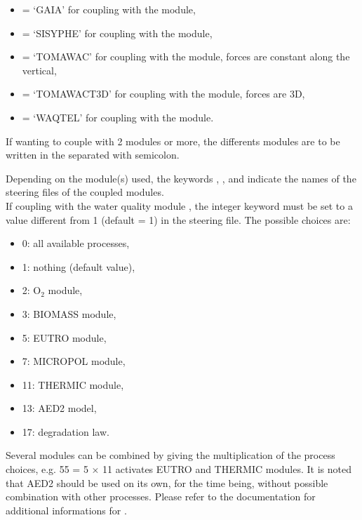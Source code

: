 \begin{itemize}
\item {} = `GAIA' for coupling with the \gaia module,

\item {} = `SISYPHE' for coupling with the \sisyphe module,

\item {} = `TOMAWAC' for coupling with the \tomawac module,
forces are constant along the vertical,

\item {} = `TOMAWACT3D' for coupling with the \tomawac module,
forces are 3D,

\item {} = `WAQTEL' for coupling with the \waqtel module.

\end{itemize}

If wanting to couple with 2 modules or more, the differents modules are to
be written in the  separated with semicolon.

Depending on the module(s) used, the keywords
, ,
 and 
indicate the names of the steering files
of the coupled modules.\\

If coupling with the water quality module \waqtel, the integer keyword
 must be set to a value different from 1
(default = 1) in the  steering file.
The possible choices are:
\begin{itemize}
\item 0: all available processes,
\item 1: nothing (default value),
\item 2: O$_2$ module,
\item 3: BIOMASS module,
\item 5: EUTRO module,
\item 7: MICROPOL module,
\item 11: THERMIC module,
\item 13: AED2 model,
\item 17: degradation law.
\end{itemize}

Several modules can be combined by giving the multiplication of the process
choices, e.g. 55 = 5 $\times$ 11 activates EUTRO and THERMIC modules.
It is noted that AED2 should be used on its own, for the time being,
without possible combination with other processes.
Please refer to the \waqtel documentation for additional informations for
\waqtel.\\

